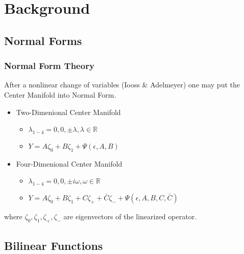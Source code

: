 \documentclass[10pt]{beamer}
\begin{document}

\section{Background}
\subsection{Normal Forms}

\frame
{
    \frametitle{Normal Form Theory}
    After a nonlinear change of variables (Iooss \& Adelmeyer) one may put the Center Manifold into Normal Form.

   \begin{itemize}
   \item Two-Dimenional Center Manifold 
        \begin{itemize}
        \item $\lambda_{1-4} = 0, 0 , \pm \lambda, \lambda \in \mathbb{R} $
        \item $ Y = A \zeta_0 + B \zeta_1 + \Psi(\epsilon, A,B) $
        \end{itemize}
   \item Four-Dimenional Center Manifold 
        \begin{itemize}
        \item $\lambda_{1-4} = 0, 0 , \pm i \omega, \omega \in \mathbb{R} $
        \item $ Y = A \zeta_0 + B \zeta_1 + C \zeta_+ + \bar{C} \zeta_- + \Psi(\epsilon, A,B,C,\bar{C}) $
        \end{itemize}
    \end{itemize}

    where $\zeta_0, \zeta_1, \zeta_+, \zeta_-$ are eigenvectors of the linearized operator.
}

\subsection{Bilinear Functions}
\end{document}
